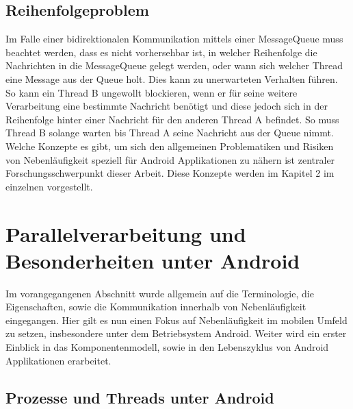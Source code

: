 \documentclass[12pt,oneside,a4paper,bibtotoc,liststotoc]{scrreprt}
\begin{document}
\subsection{Reihenfolgeproblem}
Im Falle einer bidirektionalen Kommunikation mittels einer MessageQueue muss beachtet werden, dass es nicht vorhersehbar ist, in welcher Reihenfolge die Nachrichten in die MessageQueue gelegt werden, oder wann sich welcher Thread eine Message aus der Queue holt. Dies kann zu unerwarteten Verhalten führen. So kann ein Thread B ungewollt blockieren, wenn er für seine weitere Verarbeitung eine bestimmte Nachricht benötigt und diese jedoch sich in der Reihenfolge hinter einer Nachricht für den anderen Thread A befindet. So muss Thread B solange warten bis Thread A seine Nachricht aus der Queue nimmt.
\newline
Welche Konzepte es gibt, um sich den allgemeinen Problematiken und Risiken von Nebenläufigkeit speziell für Android Applikationen zu nähern ist zentraler Forschungsschwerpunkt dieser Arbeit. Diese Konzepte werden im Kapitel 2 im einzelnen vorgestellt.


\section{Parallelverarbeitung und Besonderheiten unter Android}
Im vorangegangenen Abschnitt wurde allgemein auf die Terminologie, die Eigenschaften, sowie die Kommunikation innerhalb von Nebenläufigkeit eingegangen. Hier gilt es nun einen Fokus auf Nebenläufigkeit im mobilen Umfeld zu setzen, insbesondere unter dem Betriebsystem Android. Weiter wird ein erster Einblick in das Komponentenmodell, sowie in den Lebenszyklus von Android Applikationen erarbeitet.


\subsection{Prozesse und Threads unter Android}
\end{document}
